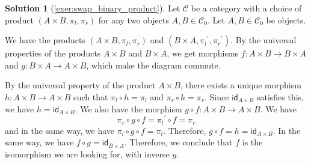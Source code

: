 \documentclass[a4paper,11pt, oneside,titlepage=false]{scrbook}
\theoremstyle{plain}
\theoremstyle{definition}
\newtheorem{solution}[thm]{Solution}
\newcommand{\cfont}[1]{\ensuremath{\mathsf{#1}}}
\newcommand{\Cat}[1]{\mathcal{#1}}
\newcommand{\CC}{\Cat{C}}
\newcommand{\Ob}[1]{{#1}_0}
\newcommand{\Id}[1][]{\cfont{id}_{#1}}
\newcommand{\projl}{\ensuremath{\pi_l}}
\newcommand{\projr}{\ensuremath{\pi_r}}
\begin{document}
\begin{solution}[\cref{exer:swap_binary_product}]\label{sol:swap_binary_product}
  Let $\CC$ be a category with a choice of product $(A\times B, \projl, \projr)$ for any two objects $A,B\in \Ob{\CC}$. Let $A, B \in \Ob\CC$ be objects.

	\begin{center}
	\end{center}

	We have the products $ (A \times B, \projl, \projr) $ and $ (B \times A, \projl^\prime, \projr^\prime) $. By the universal properties of the products $ A \times B $ and $ B \times A $, we get morphisms $ f: A \times B \to B \times A $ and $ g: B \times A \to A \times B $, which make the diagram commute.

	By the universal property of the product $ A \times B $, there exists a unique morphism $ h: A \times B \to A \times B $ such that $ \projl \circ h = \projl $ and $ \projr \circ h = \projr $. Since $ \Id[A \times B] $ satisfies this, we have $ h = \Id[A \times B] $. We also have the morphism $ g \circ f: A \times B \to A \times B $. We have
	\[ \projr \circ g \circ f = \projl^\prime \circ f = \projr \]
	and in the same way, we have $ \projl \circ g \circ f = \projl $. Therefore, $ g \circ f = h = \Id[A \times B] $. In the same way, we have $ f \circ g = \Id[B \times A] $. Therefore, we conclude that $ f $ is the isomorphism we are looking for, with inverse $ g $.
\end{solution}
\end{document}
